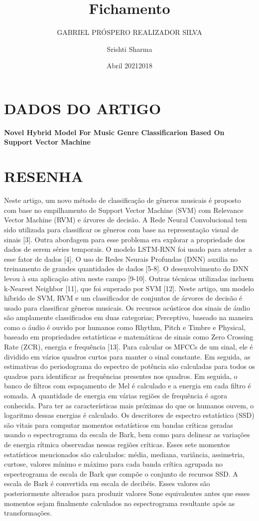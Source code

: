 \documentclass{article}
\title{Fichamento}
\author{GABRIEL PRÓSPERO REALIZADOR  SILVA}
\date{Abril 2021}
\begin{document}
\maketitle

\section{DADOS DO ARTIGO}
\textbf{Novel Hybrid Model For Music Genre Classificarion Based On Support Vector Machine﻿ \\}
\author{Srishti Sharma \\}
\date{2018}

\section{RESENHA}
Neste artigo, um novo método de classificação de gêneros musicais é proposto com base no empilhamento de Support Vector Machine (SVM) com Relevance Vector Machine (RVM) e árvores de decisão.
A Rede Neural Convolucional tem sido utilizada para classificar os gêneros com base na representação visual de sinais [3].
Outra abordagem para esse problema era explorar a propriedade dos dados de serem séries temporais. O modelo LSTM-RNN foi usado para atender a esse fator de dados [4]. O uso de Redes Neurais Profundas (DNN) auxilia no treinamento de grandes quantidades de dados [5-8]. 
O desenvolvimento do DNN levou à sua aplicação ativa neste campo [9-10]. 
Outras técnicas utilizadas incluem k-Nearest Neighbor [11], que foi superado por SVM [12]. Neste artigo, um modelo híbrido de SVM, RVM e um classificador de conjuntos de árvores de decisão é usado para classificar gêneros musicais.
Os recursos acústicos dos sinais de áudio são amplamente classificados em duas categorias; Perceptivo, baseado na maneira como o áudio é ouvido por humanos como Rhythm, Pitch e Timbre e Physical, baseado em propriedades estatísticas e matemáticas de sinais como Zero Crossing Rate (ZCR), energia e frequência [13].
Para calcular os MFCCs de um sinal, ele é dividido em vários quadros curtos para manter o sinal constante. Em seguida, as estimativas do periodograma do espectro de potência são calculadas para todos os quadros para identificar as frequências presentes nos quadros. Em seguida, o banco de filtros com espaçamento de Mel é calculado e a energia em cada filtro é somada. A quantidade de energia em várias regiões de frequência é agora conhecida. Para ter as características mais próximas do que os humanos ouvem, o logaritmo dessas energias é calculado.
Os descritores de espectro estatístico (SSD) são vitais para computar momentos estatísticos em bandas críticas geradas usando o espectrograma da escala de Bark, bem como para delinear as variações de energia rítmica observadas nessas regiões críticas. Esses sete momentos estatísticos mencionados são calculados: média, mediana, variância, assimetria, curtose, valores mínimo e máximo para cada banda crítica agrupada no espectrograma de escala de Bark que compõe o conjunto de recursos SSD. A escala de Bark é convertida em escala de decibéis. Esses valores são posteriormente alterados para produzir valores Sone equivalentes antes que esses momentos sejam finalmente calculados no espectrograma resultante após as transformações. 
\end{document}
